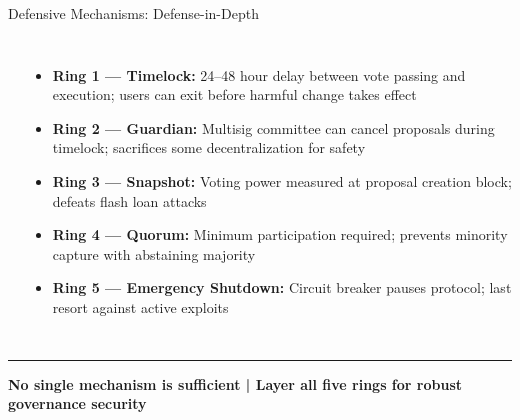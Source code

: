 \documentclass[8pt,aspectratio=169]{beamer}
\newcommand{\bottomnote}[1]{\vfill\vspace{-2mm}\textcolor{mllavender2}{\rule{\textwidth}{0.4pt}}\vspace{1mm}\footnotesize\textbf{#1}}
\begin{document}
\begin{frame}{Defensive Mechanisms: Defense-in-Depth}
\begin{columns}[t]
\begin{center}
\end{center}
\begin{itemize}\small
  \item \textbf{Ring 1 --- Timelock:} 24--48 hour delay between vote passing and execution; users can exit before harmful change takes effect
  \item \textbf{Ring 2 --- Guardian:} Multisig committee can cancel proposals during timelock; sacrifices some decentralization for safety
  \item \textbf{Ring 3 --- Snapshot:} Voting power measured at proposal creation block; defeats flash loan attacks
  \item \textbf{Ring 4 --- Quorum:} Minimum participation required; prevents minority capture with abstaining majority
  \item \textbf{Ring 5 --- Emergency Shutdown:} Circuit breaker pauses protocol; last resort against active exploits
\end{itemize}
\end{columns}
\bottomnote{No single mechanism is sufficient | Layer all five rings for robust governance security}
\end{frame}
\end{document}
